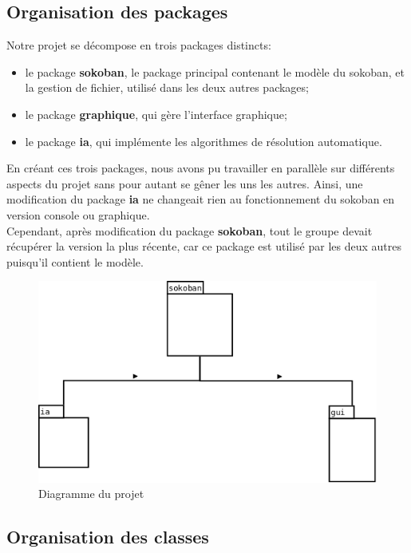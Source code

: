 \documentclass[a4paper,12pt]{article} %
\begin{document}
\subsection{Organisation des packages}

Notre projet se décompose en trois packages distincts:
\begin{itemize}
\item le package \textbf{sokoban}, le package principal contenant le modèle du sokoban, et la gestion de fichier, utilisé dans les deux autres packages;
\item le package \textbf{graphique}, qui gère l'interface graphique;
\item le package \textbf{ia}, qui implémente les algorithmes de résolution automatique.
\end{itemize}

En créant ces trois packages, nous avons pu travailler en parallèle sur différents aspects du projet sans pour autant se gêner les uns les autres.
Ainsi, une modification du package \textbf{ia} ne changeait rien au fonctionnement du sokoban en version console ou graphique.\\
Cependant, après modification du package \textbf{sokoban}, tout le groupe devait récupérer la version la plus récente, car ce package est utilisé par les deux autres puisqu'il contient le modèle.

\begin{figure}[!h]
\centering
\includegraphics[scale=0.3]{images/packages.png}
\caption{Diagramme du projet}
\end{figure}

\subsection{Organisation des classes}
\end{document}
